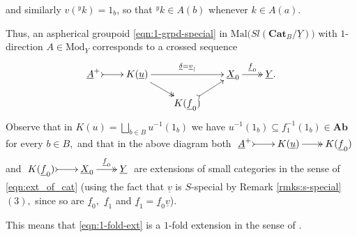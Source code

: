 \documentclass[11pt]{amsart}
\theoremstyle{plain}
\theoremstyle{definition}
\theoremstyle{remark}
\newcommand{\un}{\underline}
\begin{document}
and similarly $v({^yk}) = 1_b$, so that ${^yk}\in A(b)$ whenever $k\in A(a).$

Thus, an aspherical groupoid \eqref{eqn:1-grpd-special} in $\mathrm{Mal}\big(Sl(\mathbf{Cat}_B/\un{Y})\big)$ with $1$-direction $A\in\mathrm{Mod}_{\un{Y}}$ corresponds to a crossed sequence
\begin{equation}
\label{eqn:1-fold-ext}
\begin{aligned}
\xymatrixrowsep{1pc}
\xymatrixcolsep{1.7pc}
\xymatrix{{\un{A}^+} \ar@{>->}[r] &{K(\un{u})} \ar@{->>}[rd] \ar[rr]^-{\un{\delta}=\un{v}_|} &\ &{\un{X}_0} \ar@{->>}[r]^-{\un{f}_0} &{\un{Y}.} \\
&\ &{K(\un{f}_0)} \ar@{>->}[ru] &\ &\
}
\end{aligned}
\end{equation}
Observe that in $K(u)=\bigsqcup_{b\in B}u^{-1}(1_b)$ we have $u^{-1}(1_b)\subseteq f_1^{-1}(1_b)\in\mathbf{Ab}$ for every $b\in B,$ and that in the above diagram both $\xymatrixcolsep{1.7pc}\xymatrix{{\un{A}^+} \ar@{>->}[r] &{K(\un{u})} \ar@{->>}[r] &{K(\un{f}_0)}}$ and $\xymatrixcolsep{1.7pc}\xymatrix{{K(\un{f}_0)} \ar@{>->}[r] &{\un{X}_0} \ar@{->>}[r]^-{\un{f}_0} &{\un{Y}}}$ are extensions of small categories in the sense of \eqref{eqn:ext_of_cat} (using the fact that $\un{v}$ is $S$-special by Remark \ref{rmks:s-special}$(3),$ since so are $\un{f}_0,$ $\un{f}_1$ and $\un{f}_1=\un{f}_0\un{v}$).

This means that \eqref{eqn:1-fold-ext} is a $1$-fold extension in the sense of \cite{golasinski}.
\end{document}
